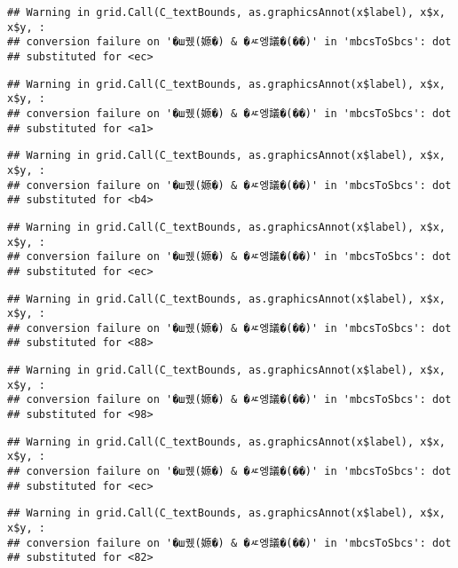 \documentclass[
]{article}
\begin{document}
\begin{verbatim}
## Warning in grid.Call(C_textBounds, as.graphicsAnnot(x$label), x$x, x$y, :
## conversion failure on '�ш퀬(嫄�) & �ㅼ엥議�(��)' in 'mbcsToSbcs': dot
## substituted for <ec>
\end{verbatim}

\begin{verbatim}
## Warning in grid.Call(C_textBounds, as.graphicsAnnot(x$label), x$x, x$y, :
## conversion failure on '�ш퀬(嫄�) & �ㅼ엥議�(��)' in 'mbcsToSbcs': dot
## substituted for <a1>
\end{verbatim}

\begin{verbatim}
## Warning in grid.Call(C_textBounds, as.graphicsAnnot(x$label), x$x, x$y, :
## conversion failure on '�ш퀬(嫄�) & �ㅼ엥議�(��)' in 'mbcsToSbcs': dot
## substituted for <b4>
\end{verbatim}

\begin{verbatim}
## Warning in grid.Call(C_textBounds, as.graphicsAnnot(x$label), x$x, x$y, :
## conversion failure on '�ш퀬(嫄�) & �ㅼ엥議�(��)' in 'mbcsToSbcs': dot
## substituted for <ec>
\end{verbatim}

\begin{verbatim}
## Warning in grid.Call(C_textBounds, as.graphicsAnnot(x$label), x$x, x$y, :
## conversion failure on '�ш퀬(嫄�) & �ㅼ엥議�(��)' in 'mbcsToSbcs': dot
## substituted for <88>
\end{verbatim}

\begin{verbatim}
## Warning in grid.Call(C_textBounds, as.graphicsAnnot(x$label), x$x, x$y, :
## conversion failure on '�ш퀬(嫄�) & �ㅼ엥議�(��)' in 'mbcsToSbcs': dot
## substituted for <98>
\end{verbatim}

\begin{verbatim}
## Warning in grid.Call(C_textBounds, as.graphicsAnnot(x$label), x$x, x$y, :
## conversion failure on '�ш퀬(嫄�) & �ㅼ엥議�(��)' in 'mbcsToSbcs': dot
## substituted for <ec>
\end{verbatim}

\begin{verbatim}
## Warning in grid.Call(C_textBounds, as.graphicsAnnot(x$label), x$x, x$y, :
## conversion failure on '�ш퀬(嫄�) & �ㅼ엥議�(��)' in 'mbcsToSbcs': dot
## substituted for <82>
\end{verbatim}
\end{document}
